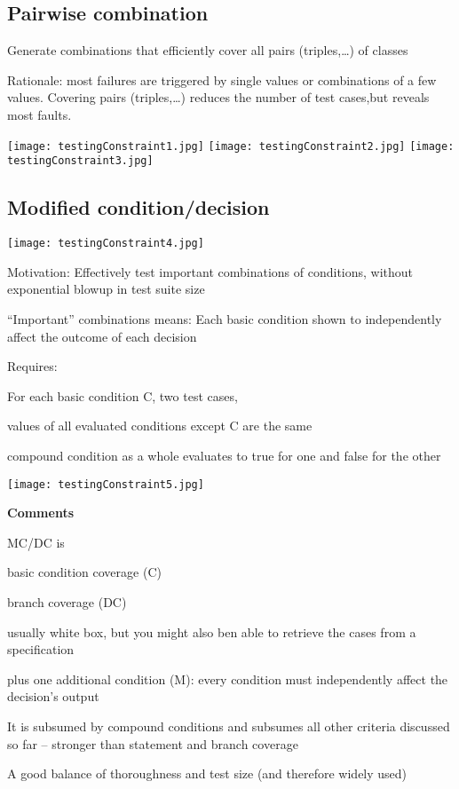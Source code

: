 \subsection{Pairwise combination}
\begin{itemize*}
	\item Generate combinations that efficiently cover all 	pairs (triples,…) of classes
	\item Rationale: most failures are triggered by single values or combinations of a few values. Covering pairs (triples,\ldots) reduces the number of test cases,but reveals most faults.
\end{itemize*}
\texttt{[image: testingConstraint1.jpg]}
\texttt{[image: testingConstraint2.jpg]}
\texttt{[image: testingConstraint3.jpg]}
\subsection{Modified condition/decision}
\texttt{[image: testingConstraint4.jpg]}

\begin{itemize*}
\item Motivation: Effectively test important combinations of conditions, without exponential blowup in test suite size
\begin{itemize*}
\item “Important” combinations means: Each basic condition shown to independently affect the outcome of each decision
\end{itemize*}
\item Requires:
\begin{itemize*}
\item For each basic condition C, two test cases,
\item values of all evaluated conditions except C are the same
\item compound condition as a whole evaluates to true for one and false for the other
\end{itemize*}
\end{itemize*}

\texttt{[image: testingConstraint5.jpg]}

\textbf{Comments}
\begin{itemize*}
\item MC/DC is
\begin{itemize*}
\item basic condition coverage (C)
\item branch coverage (DC)
\item usually white box, but you might also ben able to retrieve the cases from a specification
\item plus one additional condition (M): every condition must independently affect the decision's output
\end{itemize*}
\item It is subsumed by compound conditions and subsumes all other criteria discussed so far
– stronger than statement and branch coverage
\item A good balance of thoroughness and test size
(and therefore widely used)
\end{itemize*}


